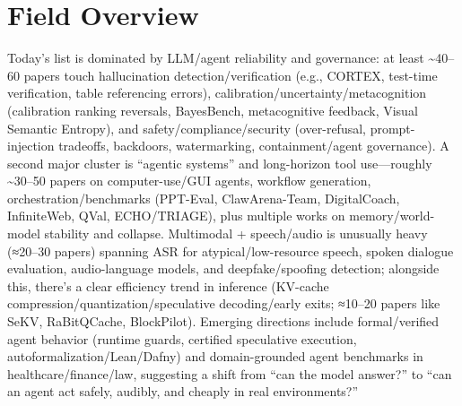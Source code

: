\documentclass[12pt,letterpaper]{article}
\begin{document}
\section*{Field Overview}
{\footnotesize Today's list is dominated by LLM/agent reliability and governance: at least \textasciitilde{}40--60 papers touch hallucination detection/verification (e.g., CORTEX, test-time verification, table referencing errors), calibration/uncertainty/metacognition (calibration ranking reversals, BayesBench, metacognitive feedback, Visual Semantic Entropy), and safety/compliance/security (over-refusal, prompt-injection tradeoffs, backdoors, watermarking, containment/agent governance). A second major cluster is ``agentic systems'' and long-horizon tool use---roughly \textasciitilde{}30--50 papers on computer-use/GUI agents, workflow generation, orchestration/benchmarks (PPT-Eval, ClawArena-Team, DigitalCoach, InfiniteWeb, QVal, ECHO/TRIAGE), plus multiple works on memory/world-model stability and collapse. Multimodal + speech/audio is unusually heavy (≈20--30 papers) spanning ASR for atypical/low-resource speech, spoken dialogue evaluation, audio-language models, and deepfake/spoofing detection; alongside this, there's a clear efficiency trend in inference (KV-cache compression/quantization/speculative decoding/early exits; ≈10--20 papers like SeKV, RaBitQCache, BlockPilot). Emerging directions include formal/verified agent behavior (runtime guards, certified speculative execution, autoformalization/Lean/Dafny) and domain-grounded agent benchmarks in healthcare/finance/law, suggesting a shift from ``can the model answer?'' to ``can an agent act safely, audibly, and cheaply in real environments?''}
\end{document}
